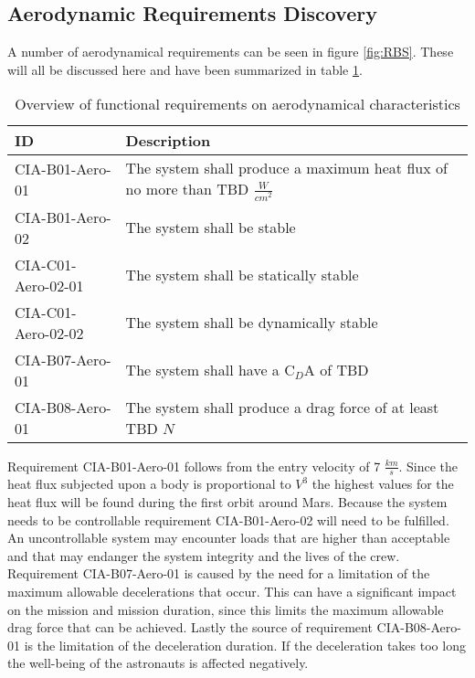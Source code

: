 \subsection{Aerodynamic Requirements Discovery} 
\label{sec:aero}
A number of aerodynamical requirements can be seen in figure \ref{fig:RBS}. These will all be discussed here and have been summarized in table \ref{tab:aeroreqs}. 


\begin{table}[h]
	\caption{Overview of functional requirements on aerodynamical characteristics}
	\label{tab:aeroreqs}
	\begin{tabular}{|p{}|p{}|}
		\hline
		ID & Description \\
		\hline \hline
		CIA-B01-Aero-01 & The system shall produce a maximum heat flux of no more than TBD $\frac{W}{cm^{2}}$ \\ \hline
		CIA-B01-Aero-02 & The system shall be stable \\ \hline
		CIA-C01-Aero-02-01 & The system shall be statically stable \\ \hline
		CIA-C01-Aero-02-02 & The system shall be dynamically stable \\ \hline
		CIA-B07-Aero-01 & The system shall have a C$_{D}$A of TBD \\ \hline
		CIA-B08-Aero-01 & The system shall produce a drag force of at least TBD $N$ \\ \hline
	\end{tabular}
\end{table}

Requirement CIA-B01-Aero-01 follows from the entry velocity of 7 $\frac{km}{s}$. Since the heat flux subjected upon a body is proportional to $V^{3}$ \cite{Tauber1986} the highest values for the heat flux will be found during the first orbit around Mars. 
Because the system needs to be controllable requirement CIA-B01-Aero-02 will need to be fulfilled. An uncontrollable system may encounter loads that are higher than acceptable and that may endanger the system integrity and the lives of the crew.
Requirement CIA-B07-Aero-01 is caused by the need for a limitation of the maximum allowable decelerations that occur. This can have a significant impact on the mission and mission duration, since this limits the maximum allowable drag force that can be achieved.
Lastly the source of requirement CIA-B08-Aero-01 is the limitation of the deceleration duration. If the deceleration takes too long the well-being of the astronauts is affected negatively.